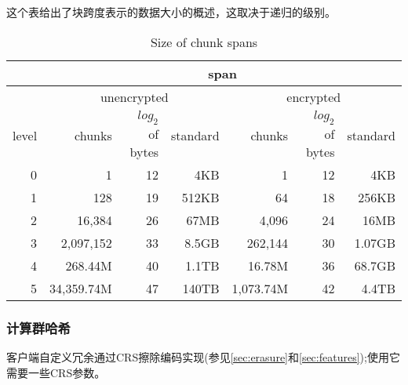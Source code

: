 
这个表给出了块跨度表示的数据大小的概述，这取决于递归的级别。

\begin{table}[ht]
\begin{tabular}{|r||r|r|r||r|r|r|}
\hline
&\multicolumn{6}{|c|}{span}\\\hline
&\multicolumn{3}{|c|}{unencrypted}
&\multicolumn{3}{|c|}{encrypted}\\\hline
level & chunks & $\mathit{log}_2$ of bytes & standard & chunks & $\mathit{log}_2$ of bytes & standard \\
\hline\hline
0 & 1 & 12 & 4KB & 1 & 12 & 4KB \\\hline
1 & 128 & 19 & 512KB & 64 & 18 & 256KB \\\hline
2 & 16,384 & 26 & 67MB & 4,096 & 24 & 16MB \\\hline
3 & 2,097,152 &33 & 8.5GB & 262,144 &  30 & 1.07GB\\\hline
4 & 268.44M & 40  & 1.1TB & 16.78M & 36 & 68.7GB\\\hline
5 & 34,359.74M & 47 & 140TB & 1,073.74M & 42  & 4.4TB\\\hline
\end{tabular}
\caption{Size of chunk spans}
\end{table}




\subsubsection{计算群哈希}

客户端自定义冗余通过CRS擦除编码实现(参见\ref{sec:erasure}和\ref{sec:features});使用它需要一些CRS参数。
      
